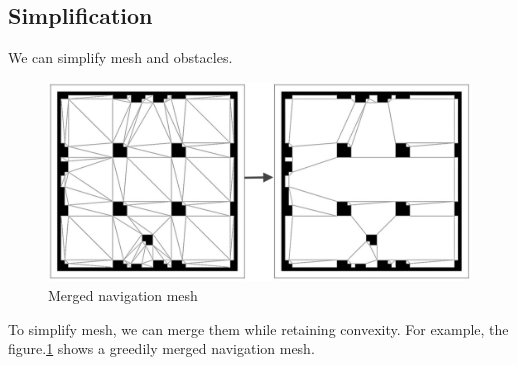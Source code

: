 \subsection{Simplification}
We can simplify mesh and obstacles.

\begin{figure}[h]
  \centering
  \includegraphics[width=.8\linewidth]{pic/merge.png}
  \caption{Merged navigation mesh\cite{cuicompromise}}
  \label{merge}
\end{figure}

To simplify mesh, we can merge them while retaining convexity. For example, the figure.\ref{merge}
shows a greedily merged navigation mesh.

